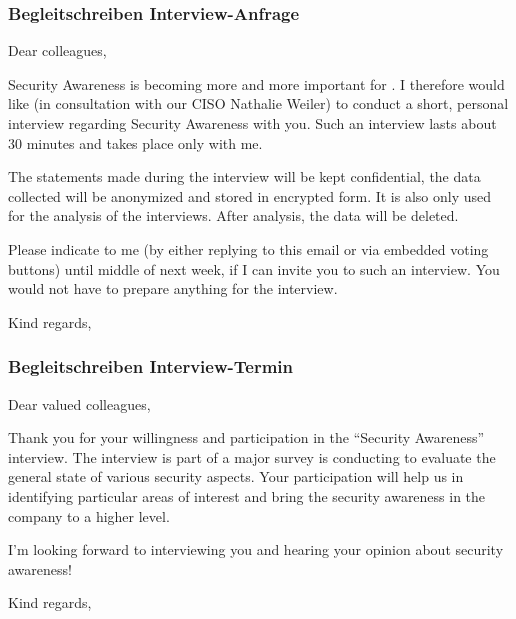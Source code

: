 \documentclass[../../main.tex]{subfiles}
\begin{document}
\label{begleitschreiben_interview}

\subsubsection*{Begleitschreiben Interview-Anfrage}

\begin{sloppypar}
{\selectfont
\footnotesize

Dear colleagues,

Security Awareness is becoming more and more important for \companyshort. I therefore would like (in consultation with our CISO Nathalie Weiler) to conduct a short, personal interview regarding Security Awareness with you. Such an interview lasts about 30 minutes and takes place only with me. 

The statements made during the interview will be kept confidential, the data collected will be anonymized and stored in encrypted form. It is also only used for the analysis of the interviews. After analysis, the data will be deleted.

Please indicate to me (by either replying to this email or via embedded voting buttons) until middle of next week, if I can invite you to such an interview. You would not have to prepare anything for the interview.

Kind regards,
}
\end{sloppypar}

\vspace{1cm}

\subsubsection*{Begleitschreiben Interview-Termin}

\begin{sloppypar}
{\selectfont
\footnotesize

Dear valued colleagues,

Thank you for your willingness and participation in the "`Security Awareness"' interview. The interview is part of a major survey \companyshort is conducting to evaluate the general state of various security aspects. 
Your participation will help us in identifying particular areas of interest and bring the security awareness in the company to a higher level.

I’m looking forward to interviewing you and hearing your opinion about security awareness!

Kind regards,
}

\normalsize

\end{sloppypar}
\end{document}
